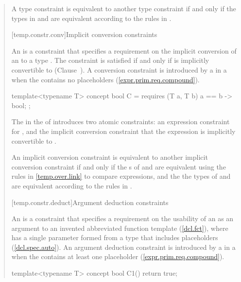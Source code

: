 \begin{quote}
\pnum
A type constraint  is equivalent to another type
constraint  if and only if the types in 
and  are equivalent according to the rules in
.


[temp.constr.conv]{Implicit conversion constraints}

\pnum
An  is a constraint that 
specifies a requirement on the implicit conversion of an 
 to a type . 
% 
The constraint is satisfied if and only if  is implicitly convertible 
to  (Clause~).
% 
\enternote
A conversion constraint is introduced by a  
in a  when the 
 contains no placeholders 
(\ref{expr.prim.req.compound}).
\exitnote
% 
\enterexample
\begin{codeblock}
template<typename T> concept bool C = 
  requires (T a, T b) {
    { a == b } -> bool;
  };
\end{codeblock}
The  in the
 of  introduces two atomic 
constraints: an expression constraint for , and the implicit 
conversion constraint that the expression  is implicitly 
convertible to .
\exitexample

\pnum
An implicit conversion constraint  is equivalent to another implicit 
conversion constraint  if and only if the s 
of  and  are equivalent using the rules in
\ref{temp.over.link} to compare expressions, and the the types
of  and  are equivalent according to the rules in
.


[temp.constr.deduct]{Argument deduction constraints}

\pnum
An  is a
constraint that specifies a requirement on 
the usability of an  
 as an argument to an invented abbreviated
function template  (\ref{dcl.fct}),
where  has a single parameter formed from a type that 
includes placeholders (\ref{dcl.spec.auto}).
% 
\enternote
An argument deduction constraint is introduced by a
 in a
 when the
contains at least one placeholder
(\ref{expr.prim.req.compound}).
\exitnote
% 
\enterexample
\begin{codeblock}
template<typename T>
concept bool C1() { return true; }


\end{codeblock}
\end{quote}

